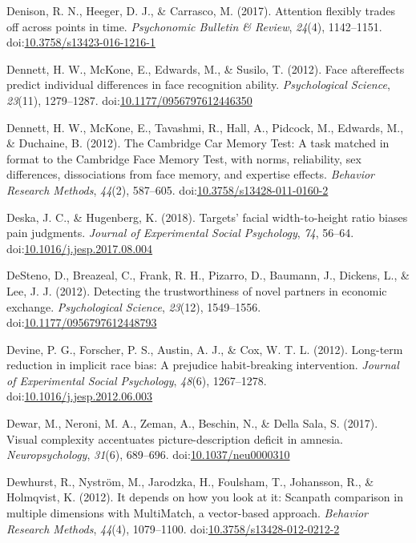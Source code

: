 \documentclass[english,man]{apa6}
\theoremstyle{definition}
\theoremstyle{definition}
\theoremstyle{definition}
\theoremstyle{remark}
\begin{document}
\hypertarget{ref-Denison2017}{}
Denison, R. N., Heeger, D. J., \& Carrasco, M. (2017). Attention
flexibly trades off across points in time. \emph{Psychonomic Bulletin \&
Review}, \emph{24}(4), 1142--1151.
doi:\href{https://doi.org/10.3758/s13423-016-1216-1}{10.3758/s13423-016-1216-1}

\hypertarget{ref-Dennett2012a}{}
Dennett, H. W., McKone, E., Edwards, M., \& Susilo, T. (2012). Face
aftereffects predict individual differences in face recognition ability.
\emph{Psychological Science}, \emph{23}(11), 1279--1287.
doi:\href{https://doi.org/10.1177/0956797612446350}{10.1177/0956797612446350}

\hypertarget{ref-Dennett2012}{}
Dennett, H. W., McKone, E., Tavashmi, R., Hall, A., Pidcock, M.,
Edwards, M., \& Duchaine, B. (2012). The Cambridge Car Memory Test: A
task matched in format to the Cambridge Face Memory Test, with norms,
reliability, sex differences, dissociations from face memory, and
expertise effects. \emph{Behavior Research Methods}, \emph{44}(2),
587--605.
doi:\href{https://doi.org/10.3758/s13428-011-0160-2}{10.3758/s13428-011-0160-2}

\hypertarget{ref-Deska2018}{}
Deska, J. C., \& Hugenberg, K. (2018). Targets' facial width-to-height
ratio biases pain judgments. \emph{Journal of Experimental Social
Psychology}, \emph{74}, 56--64.
doi:\href{https://doi.org/10.1016/j.jesp.2017.08.004}{10.1016/j.jesp.2017.08.004}

\hypertarget{ref-DeSteno2012}{}
DeSteno, D., Breazeal, C., Frank, R. H., Pizarro, D., Baumann, J.,
Dickens, L., \& Lee, J. J. (2012). Detecting the trustworthiness of
novel partners in economic exchange. \emph{Psychological Science},
\emph{23}(12), 1549--1556.
doi:\href{https://doi.org/10.1177/0956797612448793}{10.1177/0956797612448793}

\hypertarget{ref-Devine2012}{}
Devine, P. G., Forscher, P. S., Austin, A. J., \& Cox, W. T. L. (2012).
Long-term reduction in implicit race bias: A prejudice habit-breaking
intervention. \emph{Journal of Experimental Social Psychology},
\emph{48}(6), 1267--1278.
doi:\href{https://doi.org/10.1016/j.jesp.2012.06.003}{10.1016/j.jesp.2012.06.003}

\hypertarget{ref-Dewar2017}{}
Dewar, M., Neroni, M. A., Zeman, A., Beschin, N., \& Della Sala, S.
(2017). Visual complexity accentuates picture-description deficit in
amnesia. \emph{Neuropsychology}, \emph{31}(6), 689--696.
doi:\href{https://doi.org/10.1037/neu0000310}{10.1037/neu0000310}

\hypertarget{ref-Dewhurst2012}{}
Dewhurst, R., Nyström, M., Jarodzka, H., Foulsham, T., Johansson, R., \&
Holmqvist, K. (2012). It depends on how you look at it: Scanpath
comparison in multiple dimensions with MultiMatch, a vector-based
approach. \emph{Behavior Research Methods}, \emph{44}(4), 1079--1100.
doi:\href{https://doi.org/10.3758/s13428-012-0212-2}{10.3758/s13428-012-0212-2}
\end{document}
